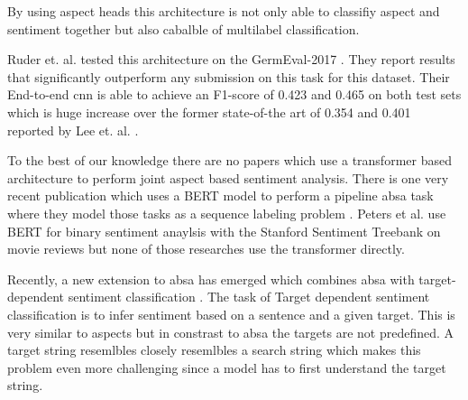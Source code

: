 By using aspect heads this architecture is not only able to classifiy aspect and sentiment together but also cabalble of multilabel classification.

Ruder et. al. tested this architecture on the GermEval-2017 \cite{Wojatzki2017}. They report results that significantly outperform any submission on this task for this dataset. Their End-to-end \gls{cnn} is able to achieve an F1-score of 0.423 and 0.465 on both test sets which is huge increase over the former state-of-the art of 0.354 and 0.401 reported by Lee et. al. \cite{Lee2017}.
\medskip

To the best of our knowledge there are no papers which use a transformer based architecture to perform joint aspect based sentiment analysis. There is one very recent publication which uses a BERT \cite{Devlin2018} model to perform a pipeline \gls{absa} task where they model those tasks as a sequence labeling problem \cite{Xu2019}. Peters et al. use BERT for binary sentiment anaylsis with the Stanford Sentiment Treebank \cite{Socher2013} on movie reviews \cite{Peters2019} but none of those researches use the transformer directly.
\medskip

Recently, a new extension to \gls{absa} has emerged which combines \gls{absa} with target-dependent sentiment classification \cite{Tang2016}. The task of Target dependent sentiment classification is to infer sentiment based on a sentence and a given target. This is very similar to aspects but in constrast to \gls{absa} the targets are not predefined. A target string resemlbles closely resemlbles a search string which makes this problem even more challenging since a model has to first understand the target string.
